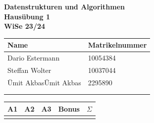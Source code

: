\documentclass[a4paper,12pt]{scrartcl}
\def\Nr{1}					%
\def\NameA{Dario Estermann}	%
\def\MatA{10054384}			%
\def\NameB{Steffan Wolter}		%
\def\MatB{10037044}			%
\def\NameC{Ümit Akbas}				%
\def\MatC{2295890}					%
\def\NameD{}				%
\def\MatD{}					%
\begin{document}
\begin{center}
	\sffamily
	\bfseries
	\LARGE
	Datenstrukturen und Algorithmen\\
	\Large
	\vspace{.2\parskip}
	Hausübung \Nr\\
	\normalsize\normalfont
	WiSe 23/24
	\vspace{.2\parskip}
\end{center}

\begin{tabular}[t]{p{4.5cm} p{3cm}}
	\toprule
	Name & Matrikelnummer\\
	\midrule
	\NameA & \MatA\\
	\NameB & \MatB\\
	\ifx\NameC\empty\else\NameC & \MatC\\\fi
	\ifx\NameD\empty\else\NameD & \MatD\\\fi
	\bottomrule
\end{tabular}
\hfill
\begin{tabular}[t]{ccccc}
	\toprule
	A1 & A2 & A3 & Bonus & $\Sigma$ \\
	\midrule
	\\
	\bottomrule	
\end{tabular}
\hfill\\


\end{document}

